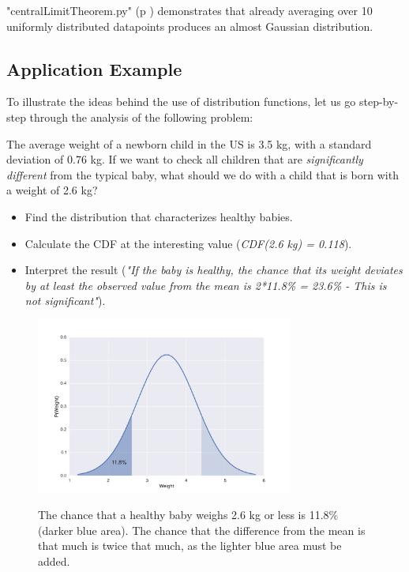 \PyImg "centralLimitTheorem.py" (p \pageref{py:centralLimitTheorem}) demonstrates that already averaging over 10 uniformly distributed datapoints produces an almost Gaussian distribution.

\subsection{Application Example}

To illustrate the ideas behind the use of distribution functions, let us go step-by-step through the analysis of the following problem:

The average weight of a newborn child in the US is 3.5 kg, with a standard deviation of 0.76 kg. If we want to check all children that are \emph{significantly different} from the typical baby, what should we do with a child that is born with a weight of 2.6 kg?

\begin{itemize}
  \item Find the distribution that characterizes healthy babies.
  \item Calculate the CDF at the interesting value (\emph{CDF(2.6 kg) = 0.118}).
  \item Interpret the result (\emph{"If the baby is healthy, the chance that its weight deviates by at least the observed value from the mean is 2*11.8\% = 23.6\% - This is not significant"}).
\end{itemize}

\begin{figure}
  \centering
  \includegraphics[width=0.75\textwidth]{../Images/pdf_checkValue.png}\\
  \caption{The chance that a healthy baby weighs 2.6 kg or less is 11.8\% (darker blue area). The chance that the difference from the mean is that much is twice that much, as the lighter blue area must be added.}\label{fig:pdf_checkValue}
\end{figure}

